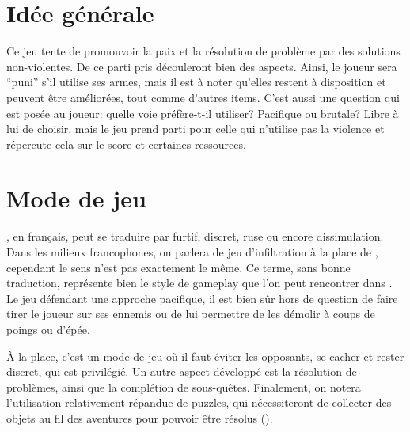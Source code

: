 \printMiniToc

\label{chap:gameplay}


\section{Idée générale}
Ce jeu tente de promouvoir la paix et la résolution de problème par des solutions non-violentes. De ce parti pris découleront bien des aspects. Ainsi, le joueur sera \enquote{puni} s'il utilise ses armes, mais il est à noter qu'elles restent à disposition et peuvent être améliorées, tout comme d'autres items. C'est aussi une question qui est posée au joueur: quelle voie préfère-t-il utiliser? Pacifique ou brutale? Libre à lui de choisir, mais le jeu prend parti pour celle qui n'utilise pas la violence et répercute cela sur le score et certaines ressources.

\section{Mode de jeu }
, en français, peut se traduire par furtif, discret, ruse ou encore dissimulation. Dans les milieux francophones, on parlera de jeu d'infiltration à la place de , cependant le sens n'est pas exactement le même. Ce terme, sans bonne traduction, représente bien le style de gameplay que l'on peut rencontrer dans \nomJeu. Le jeu défendant une approche pacifique, il est bien sûr hors de question de faire tirer le joueur sur ses ennemis ou de lui permettre de les démolir à coups de poings ou d'épée.

À la place, c'est un mode de jeu où il faut éviter les opposants, se cacher et rester discret, qui est privilégié. Un autre aspect développé est la résolution de problèmes, ainsi que la complétion de sous-quêtes. Finalement, on notera l'utilisation relativement répandue de puzzles, qui nécessiteront de collecter des objets au fil des aventures pour pouvoir être résolus (). \cite{Stealthgame_}


